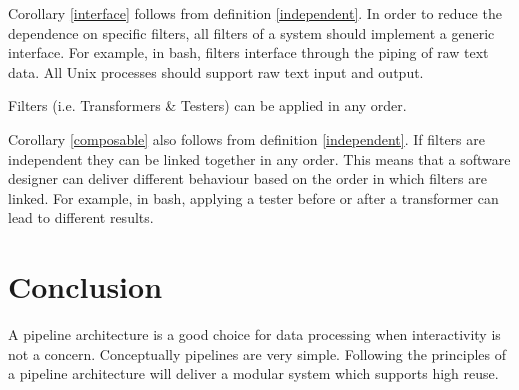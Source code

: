 Corollary \ref{interface} follows from definition \ref{independent}.
In order to reduce the dependence on specific filters,
all filters of a system should implement a generic interface.
For example, in bash, filters interface through the piping of raw text data.
All Unix processes should support raw text input and output.

\begin{corollary}\label{composable}
    Filters (i.e. Transformers \& Testers) can be applied in any order.
\end{corollary}

Corollary \ref{composable} also follows from definition \ref{independent}.
If filters are independent they can be linked together in any order.
This means that a software designer can deliver different behaviour based on the order in which filters are linked.
For example, in bash, applying a tester before or after a transformer can lead to different results.

\section{Conclusion}

A pipeline architecture is a good choice for data processing when interactivity is not a concern.
Conceptually pipelines are very simple.
Following the principles of a pipeline architecture will deliver a modular system which supports high reuse.

